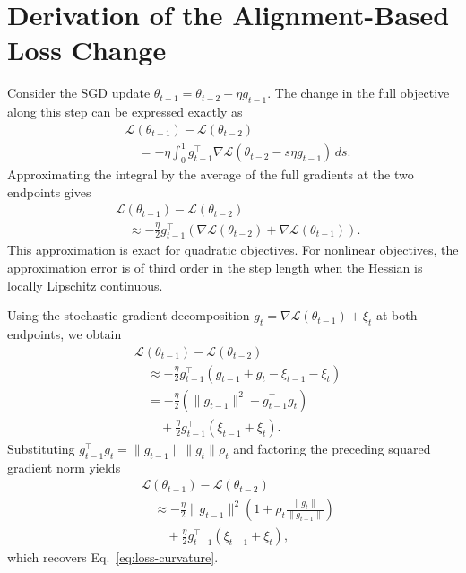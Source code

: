 \section{Derivation of the Alignment-Based Loss Change}
\label{appendix:loss-curvature}

Consider the SGD update
$\theta_{t-1}=\theta_{t-2}-\eta g_{t-1}$.
The change in the full objective along this step can be
expressed exactly as
\begin{equation}
\begin{aligned}
&\mathcal{L}(\theta_{t-1})-\mathcal{L}(\theta_{t-2})\\
&\quad=-\eta\int_0^1
g_{t-1}^\top
\nabla\mathcal{L}(\theta_{t-2}-s\eta g_{t-1})\,ds.
\end{aligned}
\label{eq:appendix-loss-integral}
\end{equation}
Approximating the integral by the average of the full gradients
at the two endpoints gives
\begin{equation}
\begin{aligned}
&\mathcal{L}(\theta_{t-1})-\mathcal{L}(\theta_{t-2})\\
&\quad\approx-\frac{\eta}{2}g_{t-1}^\top
\left(
\nabla\mathcal{L}(\theta_{t-2})
+\nabla\mathcal{L}(\theta_{t-1})
\right).
\end{aligned}
\label{eq:appendix-loss-average}
\end{equation}
This approximation is exact for quadratic objectives.
For nonlinear objectives, the approximation error is of
third order in the step length when the Hessian is locally
Lipschitz continuous.

Using the stochastic gradient decomposition
$g_t=\nabla\mathcal{L}(\theta_{t-1})+\xi_t$
at both endpoints, we obtain
\begin{equation}
\begin{aligned}
&\mathcal{L}(\theta_{t-1})-\mathcal{L}(\theta_{t-2})\\
&\quad\approx-\frac{\eta}{2}g_{t-1}^\top
(g_{t-1}+g_t-\xi_{t-1}-\xi_t)\\
&\quad=-\frac{\eta}{2}
\left(\|g_{t-1}\|^2+g_{t-1}^\top g_t\right)\\
&\qquad+\frac{\eta}{2}
g_{t-1}^\top(\xi_{t-1}+\xi_t).
\end{aligned}
\label{eq:appendix-loss-gradient}
\end{equation}
Substituting
$g_{t-1}^\top g_t
=\|g_{t-1}\|\|g_t\|\rho_t$
and factoring the preceding squared gradient norm yields
\begin{equation}
\begin{aligned}
&\mathcal{L}(\theta_{t-1})-\mathcal{L}(\theta_{t-2})\\
&\quad\approx
-\frac{\eta}{2}\|g_{t-1}\|^2
\left(1+\rho_t\frac{\|g_t\|}{\|g_{t-1}\|}\right)\\
&\qquad+\frac{\eta}{2}
g_{t-1}^\top(\xi_{t-1}+\xi_t),
\end{aligned}
\end{equation}
which recovers Eq.~\eqref{eq:loss-curvature}.

